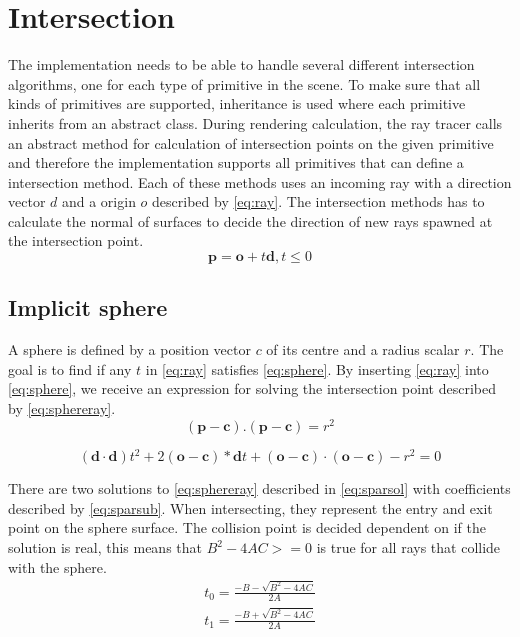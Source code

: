 \documentclass[]{report}   %
\begin{document}
\section{Intersection}
The implementation needs to be able to handle several different intersection algorithms, one for each type of primitive in the scene.
To make sure that all kinds of primitives are supported, inheritance is used where each primitive inherits from an abstract class.
During rendering calculation, the ray tracer calls an abstract method for calculation of intersection points on the given primitive and therefore the implementation supports all primitives that can define a intersection method.
Each of these methods uses an incoming ray with a direction vector $d$ and a origin $o$ described by \autoref{eq:ray}.
The intersection methods has to calculate the normal of surfaces to decide the direction of new rays spawned at the intersection point.
\begin{equation} \label{eq:ray}
\mathbf{p} = \mathbf{o} + t \mathbf{d}, t \leq 0
\end{equation}

\subsection{Implicit sphere}
A sphere is defined by a position vector $c$ of its centre and a radius scalar $r$. 
The goal is to find if any $t$ in \autoref{eq:ray} satisfies \autoref{eq:sphere}. By inserting \autoref{eq:ray} into \autoref{eq:sphere}, we receive an expression for solving the intersection point described by \autoref{eq:sphereray}.
\begin{equation} \label{eq:sphere}
(\mathbf{p} - \mathbf{c}).(\mathbf{p} - \mathbf{c}) = r^2
\end{equation}

\begin{equation} \label{eq:sphereray}
(\mathbf{d} \cdot \mathbf{d})t^2 + 2(\mathbf{o} - \mathbf{c}) * \mathbf{d} t + (\mathbf{o} - \mathbf{c}) \cdot (\mathbf{o} - \mathbf{c}) - r^2=0
\end{equation}

There are two solutions to \autoref{eq:sphereray} described in \autoref{eq:sparsol} with coefficients described by \autoref{eq:sparsub}.
When intersecting, they represent the entry and exit point on the sphere surface.
The collision point is decided dependent on if the solution is real, this means that $B^2 - 4 A C >= 0$ is true for all rays that collide with the sphere.
\begin{subequations} \label{eq:sparsol}
\begin{align} 
t_0 = \frac{ -B - \sqrt{B^2 - 4 A C} }{ 2 A }\\
t_1 = \frac{ -B + \sqrt{B^2 - 4 A C} }{ 2 A }
\end{align}
\end{subequations}
\end{document}

